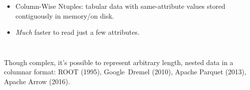 \documentclass[aspectratio=169]{beamer}
\begin{document}
\begin{frame}{}
\begin{columns}[t]
\vspace{0.25 cm}
\begin{itemize}
\item Column-Wise Ntuples: tabular data with same-attribute values stored contiguously in memory/on disk.
\item {\it Much} faster to read just a few attributes.
\end{itemize}

\end{columns}

\begin{columns}

\begin{center}
Though complex, it's possible to represent arbitrary length, nested data in a columnar format: ROOT (1995), Google~Dremel (2010), Apache Parquet (2013), Apache Arrow (2016).
\end{center}
\end{columns}
\end{frame}
\end{document}
